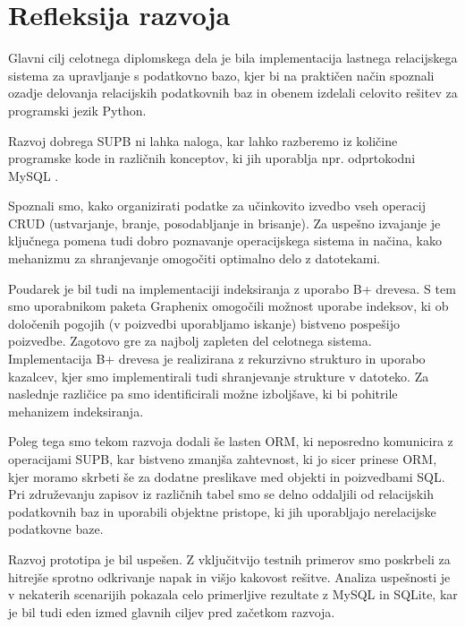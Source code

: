 \documentclass[a4paper,12pt,openright]{book}
\begin{document}
    \section{Refleksija razvoja}
    \label{refleksija}

    Glavni cilj celotnega diplomskega dela je bila implementacija lastnega relacijskega sistema za upravljanje s podatkovno bazo, kjer bi na praktičen način spoznali ozadje delovanja relacijskih podatkovnih baz in obenem izdelali celovito rešitev za programski jezik Python.

    Razvoj dobrega SUPB ni lahka naloga, kar lahko razberemo iz količine programske kode in različnih konceptov, ki jih uporablja npr. odprtokodni MySQL \cite{MYSQL_GITHUB}.
    
    Spoznali smo, kako organizirati podatke za učinkovito izvedbo vseh operacij CRUD (ustvarjanje, branje, posodabljanje in brisanje). Za uspešno izvajanje je ključnega pomena tudi dobro poznavanje operacijskega sistema in načina, kako mehanizmu za shranjevanje omogočiti optimalno delo z datotekami.
    
     Poudarek je bil tudi na implementaciji indeksiranja z uporabo B+ drevesa. S tem smo uporabnikom paketa Graphenix omogočili možnost uporabe indeksov, ki ob določenih pogojih (v poizvedbi uporabljamo iskanje) bistveno pospešijo poizvedbe. Zagotovo gre za najbolj zapleten del celotnega sistema. Implementacija B+ drevesa je realizirana z rekurzivno strukturo in uporabo kazalcev, kjer smo implementirali tudi shranjevanje strukture v datoteko. Za naslednje različice pa smo identificirali možne izboljšave, ki bi pohitrile mehanizem indeksiranja.
    
    Poleg tega smo tekom razvoja dodali še lasten ORM, ki neposredno komunicira z operacijami SUPB, kar bistveno zmanjša zahtevnost, ki jo sicer prinese ORM, kjer moramo skrbeti še za dodatne preslikave med objekti in poizvedbami SQL. Pri združevanju zapisov iz različnih tabel smo se delno oddaljili od relacijskih podatkovnih baz in uporabili objektne pristope, ki jih uporabljajo nerelacijske podatkovne baze.
    
    Razvoj prototipa je bil uspešen. Z vključitvijo testnih primerov smo poskrbeli za hitrejše sprotno odkrivanje napak in višjo kakovost rešitve. Analiza uspešnosti je v nekaterih scenarijih pokazala celo primerljive rezultate z MySQL in SQLite, kar je bil tudi eden izmed glavnih ciljev pred začetkom razvoja.


\raggedright

\printbibliography[heading=bibintoc,title={Literatura}]
\end{document}
